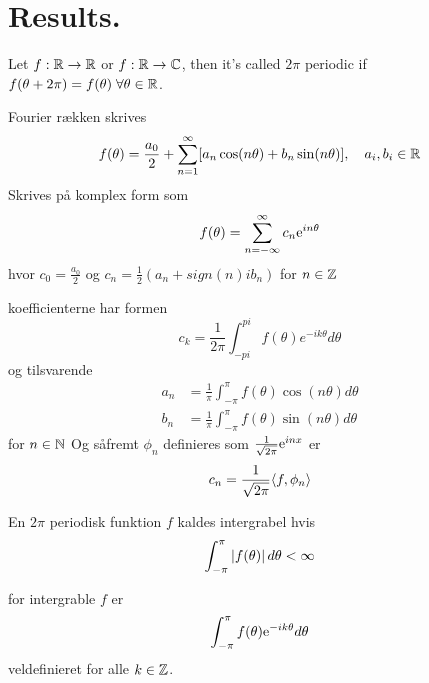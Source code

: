 \chapter*{Results.}
\begin{definition}
Let $f: \mathbb{R} \to \mathbb{R}$ or $f: \mathbb{R} \to \mathbb{C}$, then it's called $2\pi$ periodic if $f(\theta + 2\pi) = f(\theta) \;\forall \theta \in \mathbb{R}$.
\end{definition}

\begin{definition}
  Fourier rækken skrives
  \begin{equation*}
    f(\theta) = \frac{a_{0}}{2} + \sum_{n=1}^{\infty} [a_{n}\cos(n \theta) + b_{n} \sin(n \theta)], \quad a_{i}, b_{i} \in \mathbb{R}
  \end{equation*}
  Skrives på komplex form som
  \begin{equation*}
    f(\theta) = \sum_{n=-\infty}^{\infty} c_{n} \mathrm{e}^{in \theta}
  \end{equation*}
  hvor $c_{0} = \frac{a_{0}}{2}$ og $c_{n} = \frac{1}{2} (a_{n} + sign(n) i b_{n})$ for $n \in \mathbb{Z}$
\end{definition}

\begin{remark}
  koefficienterne har formen
  \begin{equation*}
    c_{k} = \frac{1}{2\pi} \int_{-pi}^{pi} f(\theta) e^{-ik \theta} d\theta
  \end{equation*}
  og tilsvarende
  \begin{align*}
    a_{n} &= \frac{1}{\pi} \int_{-\pi}^{\pi} f(\theta) \cos(n \theta) d\theta \\
    b_{n} &= \frac{1}{\pi} \int_{-\pi}^{\pi} f(\theta) \sin(n \theta) d\theta
  \end{align*}
  for $n \in \mathbb{N}$
  Og såfremt $\phi_{n}$ definieres som $\frac{1}{\sqrt{2\pi}} \mathrm{e}^{in x}$ er
  \begin{equation*}
    c_{n} = \frac{1}{\sqrt{2\pi}} \langle f, \phi_{n}\rangle
  \end{equation*}
\end{remark}

\begin{definition}
  En $2\pi$ periodisk funktion $f$ kaldes intergrabel hvis \begin{equation*}
    \int_{-\pi}^{\pi} \left|f(\theta)\right| d \theta < \infty
  \end{equation*}
\end{definition}
for intergrable $f$ er
\begin{equation*}
  \int_{-\pi}^{\pi} f(\theta) \mathrm{e}^{-ik \theta} d \theta
\end{equation*}
veldefinieret for alle $k \in \mathbb{Z}$.

